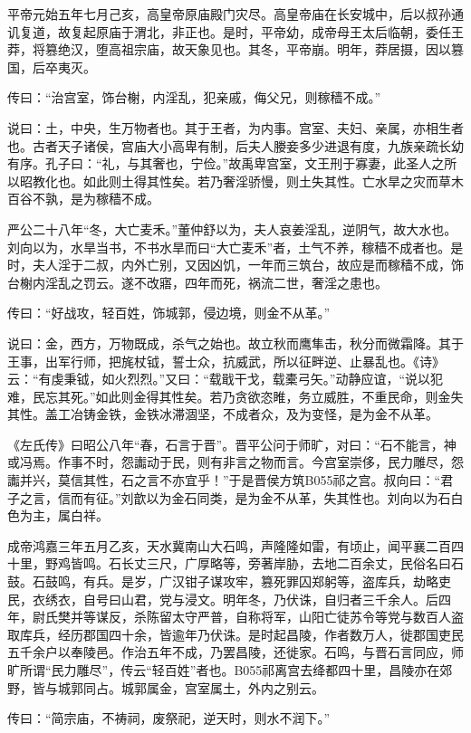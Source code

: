 \documentclass[]{article}
\begin{document}
平帝元始五年七月己亥，高皇帝原庙殿门灾尽。高皇帝庙在长安城中，后以叔孙通讥复道，故复起原庙于渭北，非正也。是时，平帝幼，成帝母王太后临朝，委任王莽，将篡绝汉，堕高祖宗庙，故天象见也。其冬，平帝崩。明年，莽居摄，因以篡国，后卒夷灭。

传曰：``治宫室，饰台榭，内淫乱，犯亲戚，侮父兄，则稼穑不成。''

说曰：土，中央，生万物者也。其于王者，为内事。宫室、夫妇、亲属，亦相生者也。古者天子诸侯，宫庙大小高卑有制，后夫人媵妾多少进退有度，九族亲疏长幼有序。孔子曰：``礼，与其奢也，宁俭。''故禹卑宫室，文王刑于寡妻，此圣人之所以昭教化也。如此则土得其性矣。若乃奢淫骄慢，则土失其性。亡水旱之灾而草木百谷不孰，是为稼穑不成。

严公二十八年``冬，大亡麦禾。''董仲舒以为，夫人哀姜淫乱，逆阴气，故大水也。刘向以为，水旱当书，不书水旱而曰``大亡麦禾''者，土气不养，稼穑不成者也。是时，夫人淫于二叔，内外亡别，又因凶饥，一年而三筑台，故应是而稼穑不成，饰台榭内淫乱之罚云。遂不改寤，四年而死，祸流二世，奢淫之患也。

传曰：``好战攻，轻百姓，饰城郭，侵边境，则金不从革。''

说曰：金，西方，万物既成，杀气之始也。故立秋而鹰隼击，秋分而微霜降。其于王事，出军行师，把旄杖钺，誓士众，抗威武，所以征畔逆、止暴乱也。《诗》云：``有虔秉钺，如火烈烈。''又曰：``载戢干戈，载橐弓矢。''动静应谊，``说以犯难，民忘其死。''如此则金得其性矣。若乃贪欲恣睢，务立威胜，不重民命，则金失其性。盖工冶铸金铁，金铁冰滞涸坚，不成者众，及为变怪，是为金不从革。

《左氏传》曰昭公八年``春，石言于晋''。晋平公问于师旷，对曰：``石不能言，神或冯焉。作事不时，怨讟动于民，则有非言之物而言。今宫室崇侈，民力雕尽，怨讟并兴，莫信其性，石之言不亦宜乎！''于是晋侯方筑B055祁之宫。叔向曰：``君子之言，信而有征。''刘歆以为金石同类，是为金不从革，失其性也。刘向以为石白色为主，属白祥。

成帝鸿嘉三年五月乙亥，天水冀南山大石鸣，声隆隆如雷，有顷止，闻平襄二百四十里，野鸡皆鸣。石长丈三尺，广厚略等，旁著岸胁，去地二百余丈，民俗名曰石鼓。石鼓鸣，有兵。是岁，广汉钳子谋攻牢，篡死罪囚郑躬等，盗库兵，劫略吏民，衣绣衣，自号曰山君，党与浸文。明年冬，乃伏诛，自归者三千余人。后四年，尉氏樊并等谋反，杀陈留太守严普，自称将军，山阳亡徒苏令等党与数百人盗取库兵，经历郡国四十余，皆逾年乃伏诛。是时起昌陵，作者数万人，徙郡国吏民五千余户以奉陵邑。作治五年不成，乃罢昌陵，还徙家。石鸣，与晋石言同应，师旷所谓``民力雕尽''，传云``轻百姓''者也。B055祁离宫去绛都四十里，昌陵亦在郊野，皆与城郭同占。城郭属金，宫室属土，外内之别云。

传曰：``简宗庙，不祷祠，废祭祀，逆天时，则水不润下。''
\end{document}
